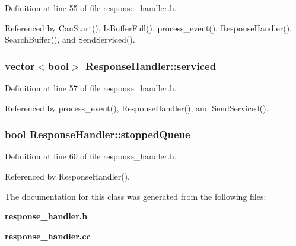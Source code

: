 Definition at line 55 of file response\_\-handler.h.

Referenced by CanStart(), IsBufferFull(), process\_\-event(), ResponseHandler(), SearchBuffer(), and SendServiced().
\subsubsection[{serviced}]{\setlength{\rightskip}{0pt plus 5cm}vector$<$bool$>$ {\bf ResponseHandler::serviced}}\label{classResponseHandler_d19bac46d848111dc78b896f775a9145}




Definition at line 57 of file response\_\-handler.h.

Referenced by process\_\-event(), ResponseHandler(), and SendServiced().
\subsubsection[{stoppedQueue}]{\setlength{\rightskip}{0pt plus 5cm}bool {\bf ResponseHandler::stoppedQueue}}\label{classResponseHandler_5d802125ddf42419a4d2dd1e7049bb1f}




Definition at line 60 of file response\_\-handler.h.

Referenced by ResponseHandler().

The documentation for this class was generated from the following files:\begin{CompactItemize}
\item 
{\bf response\_\-handler.h}\item 
{\bf response\_\-handler.cc}\end{CompactItemize}
